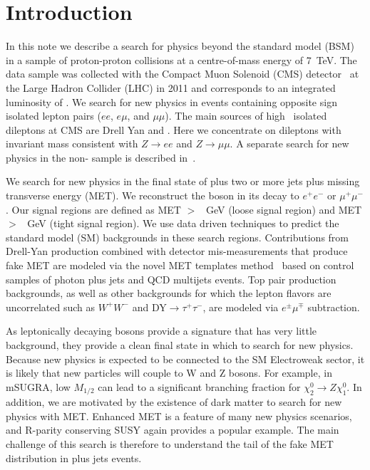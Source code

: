 
\section{Introduction}

In this note we describe a search for physics beyond the standard model (BSM) 
in a sample of proton-proton collisions at a centre-of-mass energy of 7~TeV. 
The data sample was collected with the Compact Muon Solenoid (CMS) detector~\cite{JINST} at 
the Large Hadron Collider (LHC) in 2011
and corresponds to an integrated luminosity of \lumi.
We search for new physics in events containing
opposite sign isolated lepton pairs ($ee$, $e\mu$, and $\mu\mu$).
The main sources of high \pt\ isolated dileptons at CMS are Drell Yan and \ttbar.
Here we concentrate on dileptons with invariant mass consistent
with $Z \to ee$ and $Z \to \mu\mu$.  A separate search for new physics in the non-\Z
sample is described in~\cite{ref:ospaper}.

We search for new physics in the final state of \Z plus two or more jets plus missing 
transverse energy (MET). We reconstruct the \Z boson
in its decay to $e^+e^-$ or $\mu^+\mu^-$. Our signal regions are defined as 
MET $>$ \signalmetl~GeV (loose signal region) and MET $>$ \signalmett~GeV 
(tight signal region). We use data driven techniques to predict the
standard model (SM) backgrounds in these search regions. 
Contributions from Drell-Yan production combined with detector mis-measurements that 
produce fake MET are modeled via the novel MET templates  method~\cite{ref:templates1,ref:templates2}
based on control samples of photon plus jets and QCD multijets events.
Top pair production backgrounds, as well as other backgrounds for which the lepton
flavors are uncorrelated such as $W^+W^-$ and DY$\rightarrow\tau^+\tau^-$, are 
modeled via $e^\pm\mu^\mp$ subtraction.

As leptonically decaying \Z bosons provide a signature that has very little background, 
they provide a clean final state in which to search for new physics. 
Because new physics is expected to be connected to the SM Electroweak sector, 
it is likely that new particles will couple to W and Z bosons. 
For example, in mSUGRA, low $M_{1/2}$ can lead to a significant branching fraction 
for $\chi_2^0 \rightarrow Z \chi_1^0$. 
In addition, we are motivated by the existence of dark matter to search for new physics with MET.
Enhanced MET is a feature of many new physics scenarios, and R-parity conserving SUSY 
again provides a popular example. The main challenge of this search is therefore to 
understand the tail of the fake MET distribution in \Z plus jets events.

